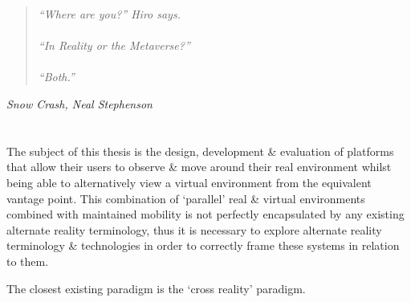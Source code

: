\begin{quote}
\textit{``Where are you?'' Hiro says.
\\
\\
``In Reality or the Metaverse?''
\\
\\
``Both.''}
\end{quote}
\hfill \textit{Snow Crash, Neal Stephenson}
\\
\\
\\




The subject of this thesis is the design, development \& evaluation of platforms that allow their users to observe \& move around their real environment whilst being able to alternatively view a virtual environment from the equivalent vantage point. This combination of `parallel' real \& virtual environments combined with maintained mobility is not perfectly encapsulated by any existing alternate reality terminology, thus it is necessary to explore alternate reality terminology \& technologies in order to correctly frame these systems in relation to them.

The closest existing paradigm is the `cross reality' paradigm.




